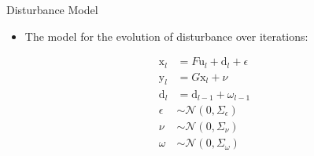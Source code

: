 \documentclass[handout]{beamer}
\newcommand{\liftedinput}{\mathrm{u}}
\newcommand{\liftedstate}{\mathrm{x}}
\newcommand{\liftedobs}{\mathrm{y}}
\newcommand{\disturbance}{\mathrm{d}}
\begin{document}
%
\begin{frame}{Disturbance Model}
\begin{itemize}
\item The model for the evolution of disturbance over iterations: \pause
\linebreak
\end{itemize}
\begin{equation}
\begin{aligned}
\liftedstate_l &= F\liftedinput_l + \disturbance_l + \epsilon \\
\liftedobs_l &= G\liftedstate_l + \nu \\
\disturbance_l &= \disturbance_{l-1} + \omega_{l-1} \\
\epsilon &\sim \mathcal{N}(0,\Sigma_{\epsilon}) \\
\nu &\sim \mathcal{N}(0,\Sigma_{\nu}) \\
\omega &\sim \mathcal{N}(0,\Sigma_{\omega}) \\
\end{aligned}
\end{equation}
\end{frame}
%
\end{document}

